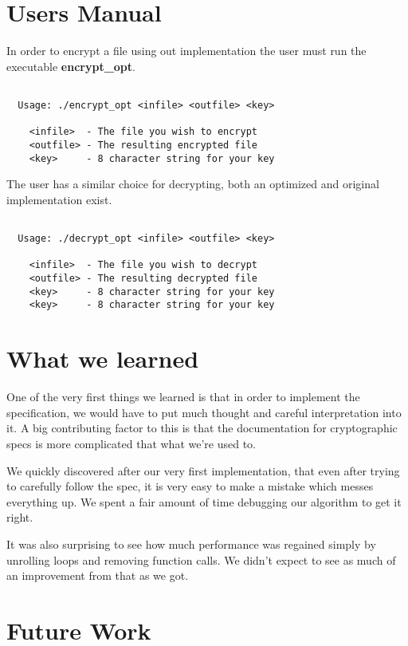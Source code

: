 \documentclass[10pt]{article}
\begin{document}
\section{Users Manual}

In order to encrypt a file using out implementation the user must run the executable \textbf{encrypt\_opt}.
\begin{verbatim}

  Usage: ./encrypt_opt <infile> <outfile> <key>

    <infile>  - The file you wish to encrypt
    <outfile> - The resulting encrypted file
    <key>     - 8 character string for your key

\end{verbatim}

The user has a similar choice for decrypting, both an optimized and original implementation exist.
\begin{verbatim}

  Usage: ./decrypt_opt <infile> <outfile> <key>

    <infile>  - The file you wish to decrypt
    <outfile> - The resulting decrypted file
    <key>     - 8 character string for your key
    <key>     - 8 character string for your key

\end{verbatim}

\section{What we learned}
One of the very first things we learned is that in order to implement the specification, we would have to put much thought and careful interpretation into it. A big contributing factor to this is that the documentation for cryptographic specs is more complicated that what we're used to.

We quickly discovered after our very first implementation, that even after trying to carefully follow the spec, it is very easy to make a mistake which messes everything up.  We spent a fair amount of time debugging our algorithm to get it right.

It was also surprising to see how much performance was regained simply by unrolling loops and removing function calls. We didn't expect to see as much of an improvement from that as we got.
\section{Future Work}
\end{document}
